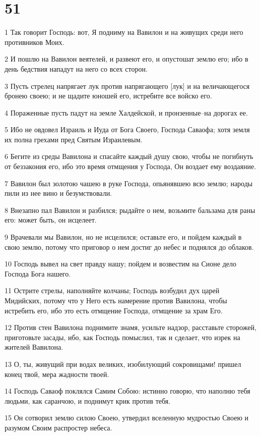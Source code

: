 \chapter{51}

\par 1 Так говорит Господь: вот, Я подниму на Вавилон и на живущих среди него противников Моих.
\par 2 И пошлю на Вавилон веятелей, и развеют его, и опустошат землю его; ибо в день бедствия нападут на него со всех сторон.
\par 3 Пусть стрелец напрягает лук против напрягающего [лук] и на величающегося бронею своею; и не щадите юношей его, истребите все войско его.
\par 4 Пораженные пусть падут на земле Халдейской, и пронзенные--на дорогах ее.
\par 5 Ибо не овдовел Израиль и Иуда от Бога Своего, Господа Саваофа; хотя земля их полна грехами пред Святым Израилевым.
\par 6 Бегите из среды Вавилона и спасайте каждый душу свою, чтобы не погибнуть от беззакония его, ибо это время отмщения у Господа, Он воздает ему воздаяние.
\par 7 Вавилон был золотою чашею в руке Господа, опьянявшею всю землю; народы пили из нее вино и безумствовали.
\par 8 Внезапно пал Вавилон и разбился; рыдайте о нем, возьмите бальзама для раны его: может быть, он исцелеет.
\par 9 Врачевали мы Вавилон, но не исцелился; оставьте его, и пойдем каждый в свою землю, потому что приговор о нем достиг до небес и поднялся до облаков.
\par 10 Господь вывел на свет правду нашу; пойдем и возвестим на Сионе дело Господа Бога нашего.
\par 11 Острите стрелы, наполняйте колчаны; Господь возбудил дух царей Мидийских, потому что у Него есть намерение против Вавилона, чтобы истребить его, ибо это есть отмщение Господа, отмщение за храм Его.
\par 12 Против стен Вавилона поднимите знамя, усильте надзор, расставьте сторожей, приготовьте засады, ибо, как Господь помыслил, так и сделает, что изрек на жителей Вавилона.
\par 13 О, ты, живущий при водах великих, изобилующий сокровищами! пришел конец твой, мера жадности твоей.
\par 14 Господь Саваоф поклялся Самим Собою: истинно говорю, что наполню тебя людьми, как саранчою, и поднимут крик против тебя.
\par 15 Он сотворил землю силою Своею, утвердил вселенную мудростью Своею и разумом Своим распростер небеса.
